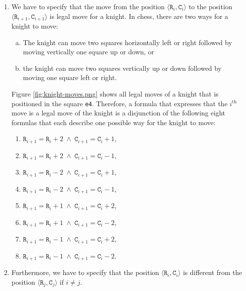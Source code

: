 \begin{enumerate}
\item We have to specify that the move from the position $\langle \mathtt{R}_i, \mathtt{C}_i \rangle$
      to the position $\langle \mathtt{R}_{i+1}, \mathtt{C}_{i+1} \rangle$ is legal move for a knight.
      In chess, there are two ways for a knight to move:
      \begin{enumerate}[(a)]
      \item The knight can move two squares horizontally left or right followed by moving vertically
            one square up or down, or
      \item the knight can move two squares vertically up or down followed by moving
            one square left or right.
      \end{enumerate}
      Figure \ref{fig:knight-moves.png} shows all legal moves of a knight that is positioned in the square \texttt{e4}.
      Therefore, a formula that expresses that the $i^{\mathrm{th}}$ move is a legal move of the knight is a disjunction
      of the following eight formulas that each describe one possible way for the knight to move:
      \begin{enumerate}
      \item $\mathtt{R}_{i+1} = \mathtt{R}_{i} + 2 \;\wedge\; \mathtt{C}_{i+1} = \mathtt{C}_{i} + 1$,
      \item $\mathtt{R}_{i+1} = \mathtt{R}_{i} + 2 \;\wedge\; \mathtt{C}_{i+1} = \mathtt{C}_{i} - 1$, 
      \item $\mathtt{R}_{i+1} = \mathtt{R}_{i} - 2 \;\wedge\; \mathtt{C}_{i+1} = \mathtt{C}_{i} + 1$, 
      \item $\mathtt{R}_{i+1} = \mathtt{R}_{i} - 2 \;\wedge\; \mathtt{C}_{i+1} = \mathtt{C}_{i} - 1$, 
      \item $\mathtt{R}_{i+1} = \mathtt{R}_{i} + 1 \;\wedge\; \mathtt{C}_{i+1} = \mathtt{C}_{i} + 2$, 
      \item $\mathtt{R}_{i+1} = \mathtt{R}_{i} + 1 \;\wedge\; \mathtt{C}_{i+1} = \mathtt{C}_{i} - 2$, 
      \item $\mathtt{R}_{i+1} = \mathtt{R}_{i} - 1 \;\wedge\; \mathtt{C}_{i+1} = \mathtt{C}_{i} + 2$, 
      \item $\mathtt{R}_{i+1} = \mathtt{R}_{i} - 1 \;\wedge\; \mathtt{C}_{i+1} = \mathtt{C}_{i} - 2$. 
      \end{enumerate}
\item Furthermore, we have to specify that the position  $\langle \mathtt{R}_i, \mathtt{C}_i \rangle$ is
      different from the position  $\langle \mathtt{R}_j, \mathtt{C}_j \rangle$ if $i \not= j$.
\end{enumerate}


